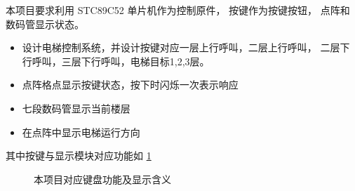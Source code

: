 \documentclass[../main.tex]{subfiles} %
\begin{document}
本项目要求利用 STC89C52 单片机作为控制原件，
按键作为按键按钮，
点阵和数码管显示状态。

\begin{itemize}
  \item 设计电梯控制系统，并设计按键对应一层上行呼叫，二层上行呼叫，
    二层下行呼叫，三层下行呼叫，电梯目标1,2,3层。
  \item 点阵格点显示按键状态，按下时闪烁一次表示响应
  \item 七段数码管显示当前楼层
  \item 在点阵中显示电梯运行方向
\end{itemize}

其中按键与显示模块对应功能如%
\cref{fig:function}
\begin{figure}[H]
  \centering
  \def\svgwidth{0.8\linewidth}
  
  \caption{本项目对应键盘功能及显示含义}
  \label{fig:function}
\end{figure}
\end{document}
